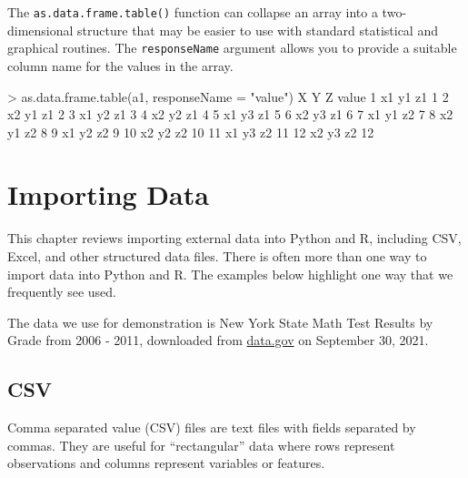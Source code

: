 \documentclass[
]{book}
\newenvironment{Shaded}{\begin{snugshade}}{\end{snugshade}}
\newcommand{\AttributeTok}[1]{\textcolor[rgb]{0.77,0.63,0.00}{#1}}
\newcommand{\DecValTok}[1]{\textcolor[rgb]{0.00,0.00,0.81}{#1}}
\newcommand{\FunctionTok}[1]{\textcolor[rgb]{0.00,0.00,0.00}{#1}}
\newcommand{\NormalTok}[1]{#1}
\newcommand{\SpecialCharTok}[1]{\textcolor[rgb]{0.00,0.00,0.00}{#1}}
\newcommand{\StringTok}[1]{\textcolor[rgb]{0.31,0.60,0.02}{#1}}
\begin{document}
The \texttt{as.data.frame.table()} function can collapse an array into a two-dimensional structure that may be easier to use with standard statistical and graphical routines. The \texttt{responseName} argument allows you to provide a suitable column name for the values in the array.

\begin{Shaded}
\begin{Highlighting}[]
\SpecialCharTok{\textgreater{}} \FunctionTok{as.data.frame.table}\NormalTok{(a1, }\AttributeTok{responseName =} \StringTok{"value"}\NormalTok{)}
\NormalTok{    X  Y  Z value}
\DecValTok{1}\NormalTok{  x1 y1 z1     }\DecValTok{1}
\DecValTok{2}\NormalTok{  x2 y1 z1     }\DecValTok{2}
\DecValTok{3}\NormalTok{  x1 y2 z1     }\DecValTok{3}
\DecValTok{4}\NormalTok{  x2 y2 z1     }\DecValTok{4}
\DecValTok{5}\NormalTok{  x1 y3 z1     }\DecValTok{5}
\DecValTok{6}\NormalTok{  x2 y3 z1     }\DecValTok{6}
\DecValTok{7}\NormalTok{  x1 y1 z2     }\DecValTok{7}
\DecValTok{8}\NormalTok{  x2 y1 z2     }\DecValTok{8}
\DecValTok{9}\NormalTok{  x1 y2 z2     }\DecValTok{9}
\DecValTok{10}\NormalTok{ x2 y2 z2    }\DecValTok{10}
\DecValTok{11}\NormalTok{ x1 y3 z2    }\DecValTok{11}
\DecValTok{12}\NormalTok{ x2 y3 z2    }\DecValTok{12}
\end{Highlighting}
\end{Shaded}

\hypertarget{importing-data}{%
\chapter{Importing Data}\label{importing-data}}

This chapter reviews importing external data into Python and R, including CSV, Excel, and other structured data files. There is often more than one way to import data into Python and R. The examples below highlight one way that we frequently see used.

The data we use for demonstration is New York State Math Test Results by Grade from 2006 - 2011, downloaded from \href{https://catalog.data.gov/dataset/2006-2011-nys-math-test-results-by-grade-citywide-by-race-ethnicity}{data.gov} on September 30, 2021.

\hypertarget{csv}{%
\section{CSV}\label{csv}}

Comma separated value (CSV) files are text files with fields separated by commas. They are useful for ``rectangular'' data where rows represent observations and columns represent variables or features.
\end{document}
